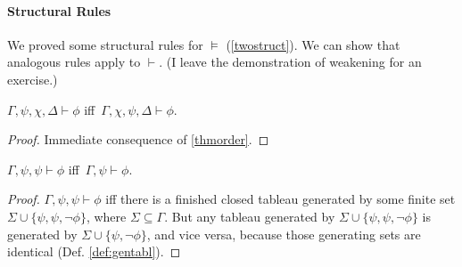 \paragraph{Structural Rules} We proved some structural rules for $\vDash$ (\autoref{twostruct}). We can show that analogous rules apply to $\vdash$. (I leave the demonstration of weakening for an exercise.) \begin{theorem}
	$\Gamma, \psi, \chi, \Delta \vdash \phi$ iff\, $\Gamma, \chi, \psi, \Delta \vdash \phi$. \begin{proof}
	Immediate consequence of \autoref{thmorder}.
	\end{proof}
\end{theorem}
\begin{theorem}
$\Gamma, \psi, \psi \vdash \phi$ iff\, $\Gamma, \psi \vdash \phi$. \begin{proof}
$\Gamma, \psi, \psi \vdash \phi$ iff there is a finished closed tableau generated by some finite set $\Sigma \cup \{\psi, \psi, ¬\phi\}$, where $\Sigma\subseteq \Gamma$. But any tableau generated by $\Sigma \cup \{\psi,\psi,¬\phi\}$ is generated by $\Sigma\cup \{\psi,¬\phi\}$, and vice versa, because those generating sets are identical (Def. \ref{def:gentabl}). 
\end{proof}
\end{theorem}


